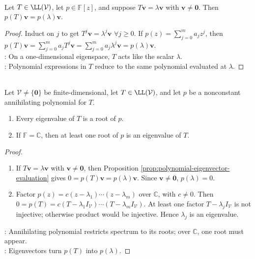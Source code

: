 \begin{proposition} \label{prop:polynomial-eigenvector-evaluation} \\
Let $T\in\LL(\mathcal{V})$, let $p\in\mathbb{F}[z]$, and suppose $T\mathbf{v}=\lambda\mathbf{v}$ with $\mathbf{v}\neq\mathbf{0}$. Then $p(T)\mathbf{v}=p(\lambda)\mathbf{v}$.
\begin{proof}
Induct on $j$ to get $T^j\mathbf{v}=\lambda^j\mathbf{v}$ $\forall j\geq0$. If $p(z)=\sum\limits_{j=0}^{m}a_jz^j$, then $p(T)\mathbf{v} =\sum\limits_{j=0}^{m}a_jT^j\mathbf{v} =\sum\limits_{j=0}^{m}a_j\lambda^j\mathbf{v} =p(\lambda)\mathbf{v}$.\\
: On a one-dimensional eigenspace, $T$ acts like the scalar $\lambda$.\\
: Polynomial expressions in $T$ reduce to the same polynomial evaluated at $\lambda$.
\end{proof}
\end{proposition}

\begin{theorem} \label{thm:annihilating-polynomials-control-spectrum} \\
Let $\mathcal{V}\neq\{\mathbf{0}\}$ be finite-dimensional, let $T\in\LL(\mathcal{V})$, and let $p$ be a nonconstant annihilating polynomial for $T$.
\begin{enumerate}[label=(\roman*)]
\setlength{\itemsep}{0pt}
\item Every eigenvalue of $T$ is a root of $p$.
\item If $\mathbb{F}=\mathbb{C}$, then at least one root of $p$ is an eigenvalue of $T$.
\end{enumerate}
\begin{proof}
\begin{enumerate}[label=(\roman*)]
\setlength{\itemsep}{0pt}
\item If $T\mathbf{v}=\lambda\mathbf{v}$ with $\mathbf{v}\neq\mathbf{0}$, then Proposition \ref{prop:polynomial-eigenvector-evaluation} gives $0=p(T)\mathbf{v}=p(\lambda)\mathbf{v}$. Since $\mathbf{v}\neq\mathbf{0}$, $p(\lambda)=0$.
\item Factor $p(z)=c(z-\lambda_1)\cdots(z-\lambda_m)$ over $\mathbb{C}$, with $c\neq0$. Then $0=p(T)=c(T-\lambda_1I_{\mathcal{V}})\cdots(T-\lambda_mI_{\mathcal{V}})$. At least one factor $T-\lambda_jI_{\mathcal{V}}$ is not injective; otherwise product would be injective. Hence $\lambda_j$ is an eigenvalue.
\end{enumerate}
: Annihilating polynomial restricts spectrum to its roots; over $\mathbb{C}$, one root must appear.\\
: Eigenvectors turn $p(T)$ into $p(\lambda)$.
\end{proof}
\end{theorem}
